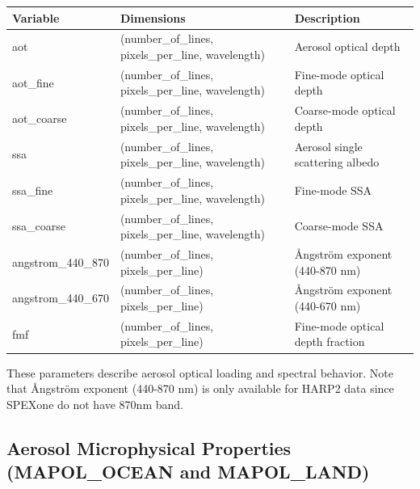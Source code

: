 \documentclass[
  letterpaper,
  open=any]{scrbook}
\begin{document}
\begin{longtable}[]{@{}
  >{\raggedright\arraybackslash}p{}
  >{\raggedright\arraybackslash}p{}
  >{\raggedright\arraybackslash}p{}@{}}
\toprule\noalign{}
\begin{minipage}[b]{\linewidth}\raggedright
Variable
\end{minipage} & \begin{minipage}[b]{\linewidth}\raggedright
Dimensions
\end{minipage} & \begin{minipage}[b]{\linewidth}\raggedright
Description
\end{minipage} \\
\midrule\noalign{}
\endhead
\bottomrule\noalign{}
\endlastfoot
aot & (number\_of\_lines, pixels\_per\_line, wavelength) & Aerosol
optical depth \\
aot\_fine & (number\_of\_lines, pixels\_per\_line, wavelength) &
Fine-mode optical depth \\
aot\_coarse & (number\_of\_lines, pixels\_per\_line, wavelength) &
Coarse-mode optical depth \\
ssa & (number\_of\_lines, pixels\_per\_line, wavelength) & Aerosol
single scattering albedo \\
ssa\_fine & (number\_of\_lines, pixels\_per\_line, wavelength) &
Fine-mode SSA \\
ssa\_coarse & (number\_of\_lines, pixels\_per\_line, wavelength) &
Coarse-mode SSA \\
angstrom\_440\_870 & (number\_of\_lines, pixels\_per\_line) & Ångström
exponent (440-870 nm) \\
angstrom\_440\_670 & (number\_of\_lines, pixels\_per\_line) & Ångström
exponent (440-670 nm) \\
fmf & (number\_of\_lines, pixels\_per\_line) & Fine-mode optical depth
fraction \\
\end{longtable}

These parameters describe aerosol optical loading and spectral behavior.
Note that Ångström exponent (440-870 nm) is only available for HARP2
data since SPEXone do not have 870nm band.

\subsection{Aerosol Microphysical Properties (MAPOL\_OCEAN and
MAPOL\_LAND)}\label{aerosol-microphysical-properties-mapol_ocean-and-mapol_land}
\end{document}
